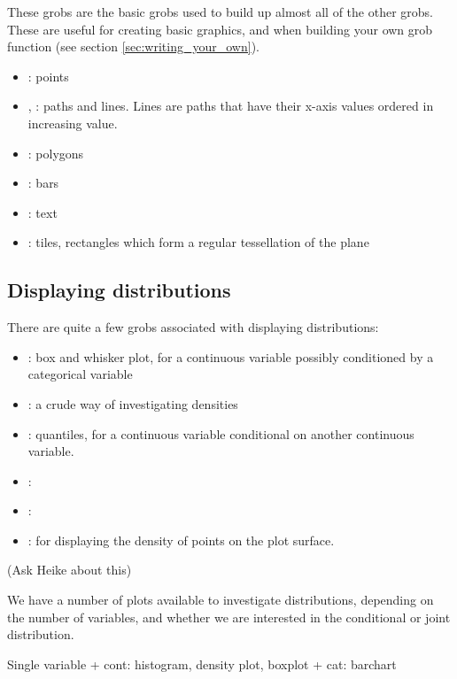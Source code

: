 These grobs are the basic grobs used to build up almost all of the other grobs.  These are useful for creating basic graphics, and when building your own grob function (see section \ref{sec:writing_your_own}).

\begin{itemize}
  \item {}: points
  \item {}, : paths and lines.  Lines are paths that have their x-axis values ordered in increasing value.
  \item {}: polygons
  \item {}: bars
  \item {}: text
  \item {}: tiles, rectangles which form a regular tessellation of the plane
\end{itemize}

\subsection{Displaying distributions}\label{sec:distributions}

There are quite a few grobs associated with displaying distributions:

\begin{itemize}
	\item {}: box and whisker plot, for a continuous variable possibly conditioned by a categorical variable
	\item {}: a crude way of investigating densities
	\item {}: quantiles, for a continuous variable conditional on another continuous variable.
	\item {}: 
	\item {}: 
	\item {}: for displaying the density of points on the plot surface.
\end{itemize}

(Ask Heike about this)

We have a number of plots available to investigate distributions, depending on the number of variables, and whether we are interested in the conditional or joint distribution.

Single variable
+ cont: histogram, density plot, boxplot
+ cat:  barchart

